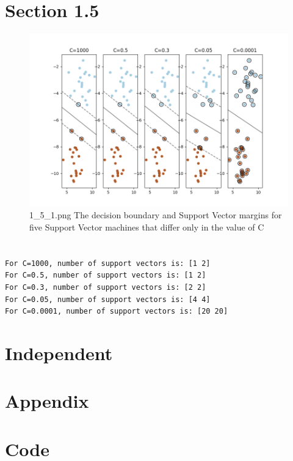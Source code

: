\documentclass{article}
\begin{document}
\section*{Section 1.5}
\begin{figure}[H]
    \centering
    \includegraphics[width=\textwidth]{08_SVM/1_5_1.png}
    \caption{1\_5\_1.png The decision boundary and Support Vector margins for five Support Vector machines that differ only in the value of C}
    \label{fig:section13}
\end{figure}

\section*{}

\begin{verbatim}
For C=1000, number of support vectors is: [1 2]
For C=0.5, number of support vectors is: [1 2]
For C=0.3, number of support vectors is: [2 2]
For C=0.05, number of support vectors is: [4 4]
For C=0.0001, number of support vectors is: [20 20]
\end{verbatim}

\section*{Independent}
\newpage
\section*{Appendix}
\appendix
\section{Code}


\end{document}

